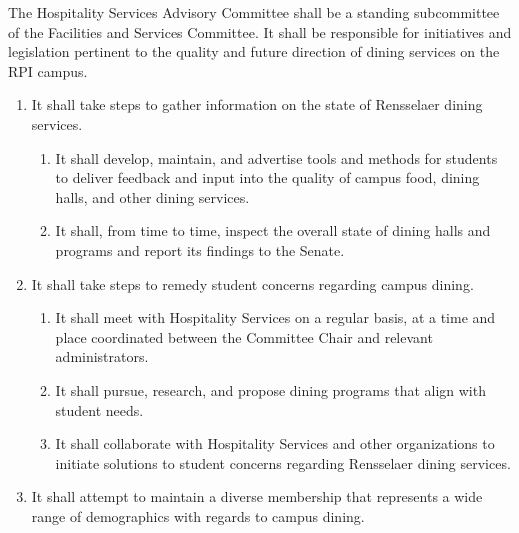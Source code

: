 \item The Hospitality Services Advisory Committee shall be a standing subcommittee of the Facilities and Services Committee. It
shall be responsible for initiatives and legislation pertinent to the quality and future direction of dining services on the RPI
campus.
\begin{enumerate}
\item It shall take steps to gather information on the state of Rensselaer dining services.
\begin{enumerate}
\item It shall develop, maintain, and advertise tools and methods for students to deliver feedback and input into the quality of
campus food, dining halls, and other dining services.
\item It shall, from time to time, inspect the overall state of dining halls and programs and report its findings to the Senate.
\end{enumerate}
\item It shall take steps to remedy student concerns regarding campus dining.
\begin{enumerate}
\item It shall meet with Hospitality Services on a regular basis, at a time and place coordinated between the Committee Chair
and relevant administrators.
\item It shall pursue, research, and propose dining programs that align with student needs.
\item It shall collaborate with Hospitality Services and other organizations to initiate solutions to student concerns regarding
Rensselaer dining services.
\end{enumerate}

\item It shall attempt to maintain a diverse membership that represents a wide range of demographics with regards to campus
dining.
\end{enumerate}